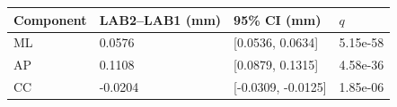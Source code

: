 \begin{tabular}{llll}
\toprule
Component & LAB2--LAB1 (mm) & 95\% CI (mm) & $q$ \\
\midrule
ML & 0.0576 & [0.0536, 0.0634] & 5.15e-58 \\
AP & 0.1108 & [0.0879, 0.1315] & 4.58e-36 \\
CC & -0.0204 & [-0.0309, -0.0125] & 1.85e-06 \\
\bottomrule
\end{tabular}

